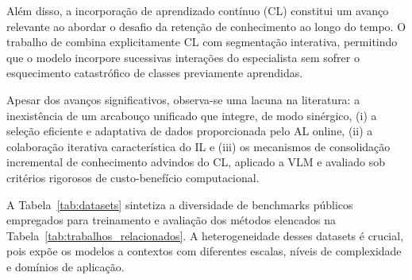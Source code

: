 Além disso, a incorporação de aprendizado contínuo (\ac{CL}) constitui um avanço relevante ao abordar o desafio da retenção de conhecimento ao longo do tempo. O trabalho de \cite{zheng2021continual} combina explicitamente \ac{CL} com segmentação interativa, permitindo que o modelo incorpore sucessivas interações do especialista sem sofrer o esquecimento catastrófico de classes previamente aprendidas.


Apesar dos avanços significativos, observa-se uma lacuna na literatura: a inexistência de um arcabouço unificado que integre, de modo sinérgico, (i) a seleção eficiente e adaptativa de dados proporcionada pelo \ac{AL} online, (ii) a colaboração iterativa característica do \ac{IL} e (iii) os mecanismos de consolidação incremental de conhecimento advindos do \ac{CL}, aplicado a \ac{VLM} e avaliado sob critérios rigorosos de custo-benefício computacional.


A Tabela~\ref{tab:datasets} sintetiza a diversidade de benchmarks públicos empregados para treinamento e avaliação dos métodos elencados na Tabela~\ref{tab:trabalhos_relacionados}. A heterogeneidade desses datasets é crucial, pois expõe os modelos a contextos com diferentes escalas, níveis de complexidade e domínios de aplicação.




